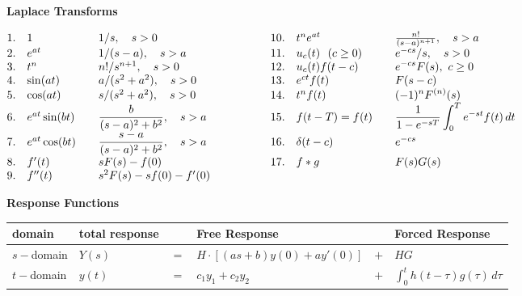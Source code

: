\begin{center}
    {\bf Laplace Transforms}\\[1pt]
\end{center}
$
\hspace*{-.5em}
\begin{array}{lllllll}
 1.  & 1 \quad  & 1/s,\quad s>0 & \qquad  \ \quad & 10.  & t^n e^{at}\  \quad  & \frac{n!}{(s-a)^{n+1}},\quad s>a\\[0ex] 
 2.  & e^{at} \quad  & 1/(s-a),\quad s>a  & \qquad  \ \quad & 11. & u_c(t)\ \ (c\ge 0) \quad  & e^{-cs}/s,\quad s>0 \\[0ex]
 3.  & t^n  \quad  & n!/s^{n+1},\quad s>0 & \qquad  \ \quad & 12.  & u_c(t)f(t-c)\  \quad  & \dm e^{-cs} F(s), \ c\ge 0 \\[0ex] 
 4.  & \sin(at) \quad  & a/(s^2+a^2),\quad s>0  & \qquad  \ \quad & 13.  & e^{ct}f(t) \quad  & \dm F(s-c) \\[0ex] 
 5.  & \cos(at) \quad  & s/(s^2+a^2),\quad s>0  & \qquad  \ \quad & 14.  & t^n f(t) \quad  & \dm (-1)^n F^{(n)}(s) \\[0ex]
 6.  & e^{at}\sin(bt) \quad  & \dm\frac{b}{(s-a)^2+b^2},\quad s>a  & \qquad  \ \quad & 15. & f(t-T) = f(t) \quad  & \dm \frac{1}{1-e^{-sT}}\int_0^Te^{-st}f(t)\,dt \\[0ex]
 7.  & e^{at}\cos(bt) \quad  & \dm\frac{s-a}{(s-a)^2+b^2},\quad s>a & \qquad  \ \quad &  16. & \delta(t-c) & e^{-cs}\\[0ex]
 8.  & f'(t) \  \quad  &  sF(s) - f(0) & \qquad  \ \quad & 17. & f\ast g & F(s)G(s) \\[0ex]
 9.  & f''(t) \  \quad   & s^2F(s) - sf(0) - f'(0) & \qquad  \ \quad &  & & \\[0ex]
\end{array} 
$

\begin{center}
    {\bf Response Functions}\\[0pt]
\end{center}
\setlength{\extrarowheight}{0.05cm}
\begin{center}
\begin{tabular}{ p{2.2cm} p{2.4cm} p{0.2cm} p{4.2cm} p{0.2cm} p{3.3cm} }
    domain &  total response & & Free Response & & Forced Response \\[2pt] \hline 
    $s-$domain & \centering $Y(s)$ & $=$ & $H \cdot \left[ (as+b) y(0) + ay'(0) \right]$ & $+$ & $HG$ \\ 
    $t-$domain & \centering $y(t)$ & $=$ & $c_1y_1 + c_2y_2$ & $+$ & $\int_0^t h(t-\tau) g(\tau) \, d\tau$ \\[2pt] 
    \hline
\end{tabular}
\end{center}
\setlength{\extrarowheight}{0cm}